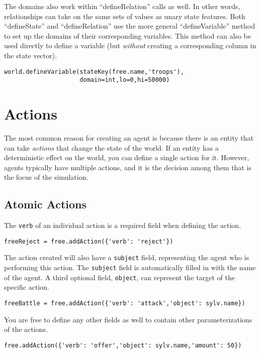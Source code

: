 \documentclass{article}
\begin{document}
The domains also work within ``defineRelation'' calls as well. In other words, relationships can take on the same sets of values as unary state features. Both ``defineState'' and ``defineRelation'' use the more general ``defineVariable'' method to set up the domains of their corresponding variables. This method can also be used directly to define a variable (but {\em without} creating a corresponding column in the state vector).

\begin{verbatim}
world.defineVariable(stateKey(free.name,'troops'),
                     domain=int,lo=0,hi=50000)
\end{verbatim}

\section{Actions}\label{sec:actions}
The most common reason for creating an agent is because there is an entity that can take {\em actions} that change the state of the world. If an entity has a deterministic effect on the world, you can define a single action for it. However, agents typically have multiple actions, and it is the decision among them that is the focus of the simulation.

\subsection{Atomic Actions}

The {\tt verb} of an individual action is a required field when defining the action. 

\begin{verbatim}
freeReject = free.addAction({'verb': 'reject'})
\end{verbatim}

The action created will also have a {\tt subject} field, representing the agent who is performing this action. The {\tt subject} field is automatically filled in with the name of the agent. A third optional field, {\tt object}, can represent the target of the specific action.

\begin{verbatim}
freeBattle = free.addAction({'verb': 'attack','object': sylv.name})
\end{verbatim}

You are free to define any other fields as well to contain other parameterizations of the actions.

\begin{verbatim}
free.addAction({'verb': 'offer','object': sylv.name,'amount': 50})
\end{verbatim}
\end{document}
